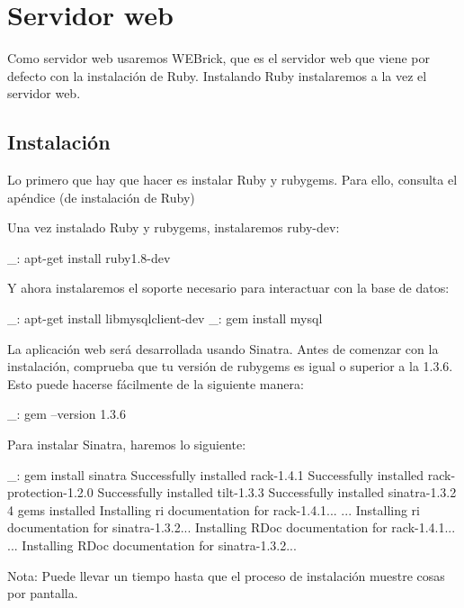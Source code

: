 \chapter{Servidor web}
\label{web:servidor}

Como servidor web usaremos WEBrick, que es el servidor web que viene por defecto con la instalación de Ruby. Instalando Ruby instalaremos a la vez el servidor web.


\section{Instalación}

Lo primero que hay que hacer es instalar Ruby y rubygems. Para ello, consulta el apéndice (de instalación de Ruby)

Una vez instalado Ruby y rubygems, instalaremos ruby-dev:

\begin{bashcode}
_: apt-get install ruby1.8-dev
\end{bashcode}

Y ahora instalaremos el soporte necesario para interactuar con la base de datos:

\begin{bashcode}
_: apt-get install libmysqlclient-dev
_: gem install mysql
\end{bashcode}

La aplicación web será desarrollada usando Sinatra. Antes de comenzar con la instalación, comprueba que tu versión de rubygems es igual o superior a la 1.3.6. Esto puede hacerse fácilmente de la siguiente manera:

\begin{bashcode}
_: gem --version
1.3.6
\end{bashcode}

Para instalar Sinatra, haremos lo siguiente:

\begin{bashcode}
_: gem install sinatra
Successfully installed rack-1.4.1
Successfully installed rack-protection-1.2.0
Successfully installed tilt-1.3.3
Successfully installed sinatra-1.3.2
4 gems installed
Installing ri documentation for rack-1.4.1...
...
Installing ri documentation for sinatra-1.3.2...
Installing RDoc documentation for rack-1.4.1...
...
Installing RDoc documentation for sinatra-1.3.2...
\end{bashcode}

Nota: Puede llevar un tiempo hasta que el proceso de instalación muestre cosas por pantalla.


